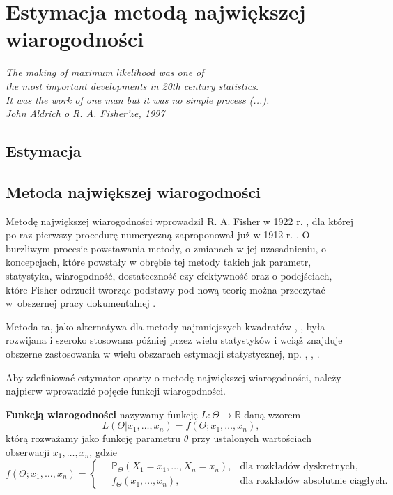 \chapter{Estymacja metodą największej wiarogodności}
\begin{flushright}
\textit{The making of maximum likelihood was one of \\
the most important developments in 20th century statistics. \\
It was the work of one man but it was no simple process (...). \\
John Aldrich o R. A. Fisher'ze, 1997 \cite{aldrich1}
}
\end{flushright}

\section{Estymacja}
\section{Metoda największej wiarogodności}

Metodę największej wiarogodności wprowadził R. A. Fisher w 1922 r. \cite{fisher2}, dla której po raz pierwszy procedurę numeryczną zaproponował już w 1912 r. \cite{fisher1}. O burzliwym procesie powstawania metody, o zmianach w jej uzasadnieniu, o koncepcjach, które powstały w obrębie tej metody takich jak parametr, statystyka, wiarogodność, dostateczność czy efektywność oraz o podejściach, które Fisher odrzucił tworząc podstawy pod nową teorię można przeczytać w~obszernej pracy dokumentalnej \cite{aldrich1}. 

Metoda ta, jako alternatywa dla metody najmniejszych kwadratów \cite{legendre1}, \cite{gauss1}, była rozwijana i szeroko stosowana później przez wielu statystyków i wciąż znajduje obszerne zastosowania w wielu obszarach estymacji statystycznej, np. \cite{hutch1}, \cite{kenward1}, \cite{millar1}.

Aby zdefiniować estymator oparty o metodę największej wiarogodności, należy najpierw wprowadzić pojęcie funkcji wiarogodności.

\begin{definition}
\textbf{Funkcją wiarogodności} nazywamy funkcję $L : \Theta \rightarrow \mathbb{R}$ daną wzorem $$ L(\Theta|x_1, \dots , x_n) = f(\Theta; x_1, \dots , x_n),$$
którą rozważamy jako funkcję parametru $\theta$ przy ustalonych wartościach obserwacji $x_1, \dots , x_n$, gdzie $$ f(\Theta; x_1, \dots , x_n) = \left\lbrace \begin{align*}
\ & \mathbb{P}_{\Theta}( X_1 = x_1, \dots , X_n = x_n), & \text{dla rozkładów dyskretnych}, & \ \\
\ & f_{\Theta}(x_1, \dots , x_n), & \text{dla rozkładów absolutnie ciągłych.} & \
\end{align*}$$

\end{definition}

